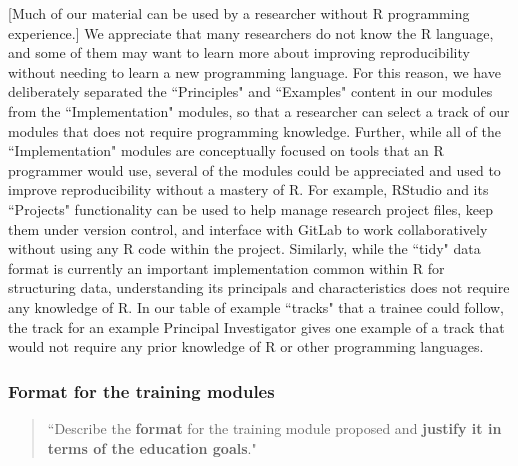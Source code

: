\documentclass[pdftex,english,11pt,parskip=half]{scrartcl}
\begin{document}
[Much of our material can be used by a researcher without R programming experience.] We appreciate that many researchers do not know the R language, and some of them may want to learn more about improving reproducibility without needing to learn a new programming language. For this reason, we have deliberately separated the ``Principles" and ``Examples" content in our modules from the ``Implementation" modules, so that a researcher can select a track of our modules that does not require programming knowledge. Further, while all of the ``Implementation" modules are conceptually focused on tools that an R programmer would use, several of the modules could be appreciated and used to improve reproducibility without a mastery of R. For example, RStudio and its ``Projects" functionality can be used to help manage research project files, keep them under version control, and interface with GitLab to work collaboratively without using any R code within the project. Similarly, while the ``tidy" data format is currently an important implementation common within R for structuring data, understanding its principals and characteristics does not require any knowledge of R. In our table of example ``tracks" that a trainee could follow, the track for an example Principal Investigator gives one example of a track that would not require any prior knowledge of R or other programming languages.   







\subsubsection*{Format for the training modules}

\begin{quotation}
``Describe the \textbf{format} for the training module proposed and \textbf{justify it in terms of the education goals}."
\end{quotation}
\end{document}
